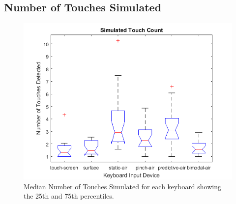 \subsection{Number of Touches Simulated}
\begin{figure}[h]
	\centering
	\includegraphics{fig_num_touches_boxplot}
	\caption[Number of Touches Simulated Boxplot]{Median Number of Touches Simulated for each keyboard showing the 25th and 75th percentiles.}
	\label{fig_num_touches_boxplot}
\end{figure}

